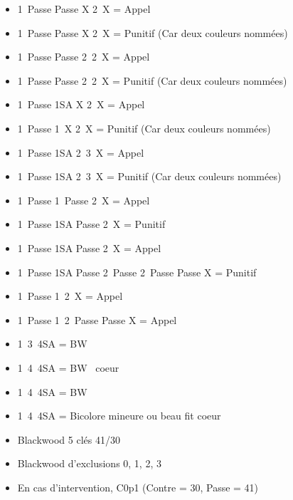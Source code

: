 \documentclass[a4paper, oneside, 11pt]{report}
\begin{document}
\begin{itemize}
	\item 1\pique\ Passe Passe X 2\pique\ X = Appel
	\item 1\pique\ Passe Passe X 2\carreau\ X = Punitif (Car deux couleurs nommées)
	\item 1\pique\ Passe Passe 2\trefle\ 2\pique\ X = Appel
	\item 1\pique\ Passe Passe 2\trefle\ 2\carreau\ X = Punitif (Car deux couleurs nommées)
	\item 1\carreau\ Passe 1SA X 2\carreau\ X = Appel
	\item 1\carreau\ Passe 1\coeur\ X 2\carreau\ X = Punitif (Car deux couleurs nommées)
	\item 1\carreau\ Passe 1SA 2\pique\ 3\carreau\ X = Appel
	\item 1\carreau\ Passe 1SA 2\pique\ 3\trefle\ X = Punitif (Car deux couleurs nommées)\\

	\item 1\coeur\ Passe 1\pique\ Passe 2\coeur\ X = Appel
	\item 1\coeur\ Passe 1SA Passe 2\coeur\ X = Punitif
	\item 1\coeur\ Passe 1SA Passe 2\trefle\ X  = Appel
	\item 1\coeur\ Passe 1SA Passe 2\trefle\ Passe 2\coeur\ Passe Passe X  = Punitif\\

	\item 1\carreau\ Passe 1\coeur\ 2\coeur\ X = Appel
	\item 1\carreau\ Passe 1\coeur\ 2\coeur\ Passe Passe X = Appel\\

	\item 1\coeur\ 3\pique\ 4SA = BW \coeur
	\item 1\coeur\ 4\carreau\ 4SA = BW \ coeur
	\item 1\pique\ 4\coeur\ 4SA = BW \pique
	\item 1\coeur\ 4\pique\ 4SA = Bicolore mineure ou beau fit coeur\\
	\end{itemize}

	\begin{itemize}
	\item Blackwood 5 clés 41/30
	\item Blackwood d'exclusions 0, 1, 2, 3
	\item En cas d'intervention,  C0p1 (Contre = 30,  Passe = 41)\\
	\end{itemize}
\end{document}
